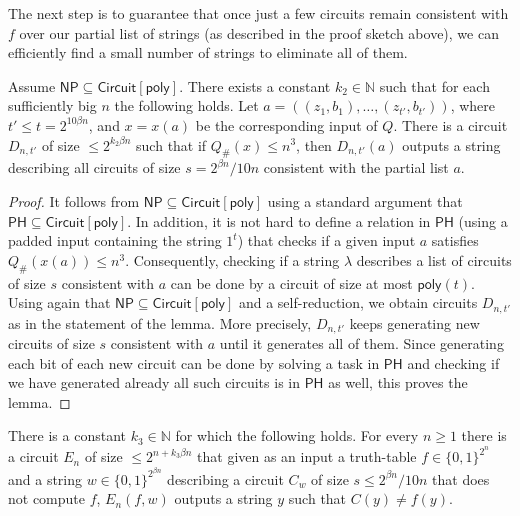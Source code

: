 \documentclass{toc}
\begin{document}
The next step is to guarantee that once just a few circuits remain consistent with $f$ over our partial list of strings (as described in the proof sketch above), we can efficiently find a small number of strings to eliminate all of them. 

\begin{lemma}\label{l:printing_remaining_circuits}
Assume $\mathsf{NP} \subseteq \mathsf{Circuit}[\mathsf{poly}]$. There exists a constant $k_2 \in \mathbb{N}$ such that for each sufficiently big $n$ the following holds. Let $a = ((z_1, b_1), \ldots, (z_{t'}, b_{t'}))$, where $t' \leq t=2^{10\beta n}$, and $x = x(a)$ be the corresponding input of $Q$.
There is a circuit $D_{n,t'}$ of size $\leq 2^{k_2 \beta n}$ such that if $Q_{\#}(x) \leq n^3$,  then $D_{n,t'}(a)$ outputs a string describing all circuits of size $s=2^{\beta n}/10n$ consistent with the partial list $a$. 
\end{lemma}

\begin{proof}
It follows from $\mathsf{NP} \subseteq \mathsf{Circuit}[\mathsf{poly}]$ using a standard argument that $\mathsf{PH} \subseteq \mathsf{Circuit}[\mathsf{poly}]$. In addition, it is not hard to define a relation in $\mathsf{PH}$ (using a padded input containing the string $1^{t}$) that checks if a given input $a$ satisfies $Q_{\#}(x(a)) \leq n^3$. Consequently, checking if a string $\lambda$ describes a list of circuits of size $s$ consistent with $a$ can be done by a circuit of size at most $\mathsf{poly}(t)$. Using again that $\mathsf{NP} \subseteq \mathsf{Circuit}[\mathsf{poly}]$ and a self-reduction, we obtain circuits $D_{n,t'}$ as in the statement of the lemma. More precisely, $D_{n,t'}$ keeps generating new circuits of size $s$ consistent with $a$ until it generates all of them. Since generating each bit of each new circuit can be done by solving a task in $\mathsf{PH}$ and checking if we have generated already all such circuits is in $\mathsf{PH}$ as well, this proves the lemma.
\end{proof}

\begin{lemma}\label{l:printing_remaining_strings}
There is a constant $k_3 \in \mathbb{N}$ for which the following holds. For every $n \geq 1$ there is a circuit $E_n$ of size $\leq 2^{n + k_3 \beta n}$ that given as an input a truth-table $f \in \{0,1\}^{2^n}$ and a string $w \in \{0,1\}^{2^{\beta n}}$ describing a circuit $C_w$ of size $s \leq 2^{\beta n}/10n$ that does not compute $f$, $E_n(f,w)$ outputs a string $y$ such that $C(y) \neq f(y)$.
\end{lemma}
\end{document}
